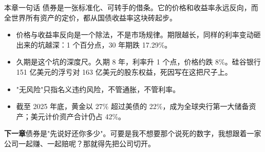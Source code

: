 \begin{takeaway}{本章一句话}
债券是一张标准化、可转手的借条。它的价格和收益率永远反向，而全世界所有资产的定价，都从国债收益率这块砖起步。

\begin{itemize}
  \item 价格与收益率反向是一个除法，不是市场规律。期限越长，同样的利率变动砸出来的坑越深：1 个百分点，30 年期跌 17.29\%。
  \item 久期是这个坑的深度尺。久期 8 年，利率升 1 个点，价格约跌 8\%。硅谷银行 151 亿美元的浮亏对 163 亿美元的股东权益，死因写在这把尺子上。
  \item "无风险"只指名义违约风险，不管通胀，不管利率。
  \item 截至 2025 年底，黄金以 27\% 超过美债的 22\%，成为全球央行第一大储备资产；美元计价资产合计仍占 42\%。
\end{itemize}

\end{takeaway}

\begin{bridgebox}
\textbf{下一章}债券是"先说好还你多少"。可要是我不想要那个说死的数字，我想跟着一家公司一起赚、一起赔呢？那就得先把公司切开。
\end{bridgebox}

